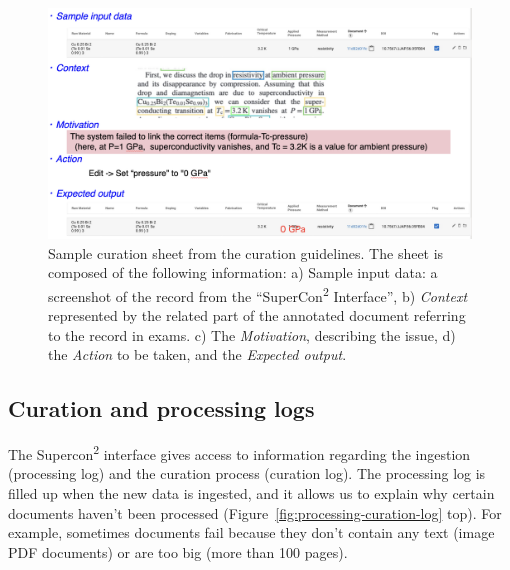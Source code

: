 \begin{figure}[htbp]
  \centering
  \includegraphics[width=1\textwidth]{figures/curation/example-sheet-curation.png} 
  \caption{Sample curation sheet from the curation guidelines. The sheet is composed of the following information: a) {Sample input data}: a screenshot of the record from the ``SuperCon\textsuperscript{2} Interface'', b) \textit{Context} represented by the related part of the annotated document referring to the record in exams. c) The \textit{Motivation}, describing the issue, d) the \textit{Action} to be taken, and the \textit{Expected output}.
 }
  \label{fig:example-curation-sheet}
\end{figure}


\subsection{Curation and processing logs}
\label{subsec:curation-and-processing-logs}

The Supercon\textsuperscript{2} interface gives access to information regarding the ingestion (processing log) and the curation process (curation log). 
The processing log is filled up when the new data is ingested, and it allows us to explain why certain documents haven't been processed (Figure~\ref{fig:processing-curation-log} top). 
For example, sometimes documents fail because they don't contain any text (image PDF documents) or are too big (more than 100 pages). 


